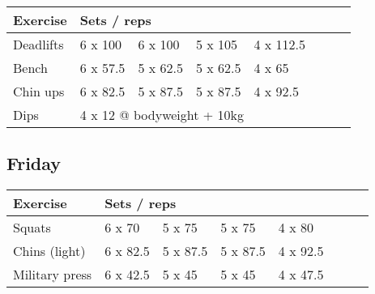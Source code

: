 \documentclass[12pt, a4paper]{article}%
\begin{document}
  \begin{tabular}{l|lllllll}
  \hspace{0.75em} \textbf{Exercise} & \multicolumn{ 7 }{l}{ \textbf{Sets / reps} } \\ \hline

            \hspace{0.75em} Deadlifts
            & 6 x 100
            & 6 x 100
            & 5 x 105
            & 4 x 112.5
            & 
            & 
            & 
            \\


            \hspace{0.75em} Bench
            & 6 x 57.5
            & 5 x 62.5
            & 5 x 62.5
            & 4 x 65
            & 
            & 
            & 
            \\


            \hspace{0.75em} Chin ups
            & 6 x 82.5
            & 5 x 87.5
            & 5 x 87.5
            & 4 x 92.5
            & 
            & 
            & 
            \\


   \hspace{0.75em} Dips &  \multicolumn{ 7 }{l}{ 4 x 12 @ bodyweight + 10kg } \\
  \end{tabular}

  \subsection*{\hspace{0.5em} Friday }


  \begin{tabular}{l|lllllll}
  \hspace{0.75em} \textbf{Exercise} & \multicolumn{ 7 }{l}{ \textbf{Sets / reps} } \\ \hline

            \hspace{0.75em} Squats
            & 6 x 70
            & 5 x 75
            & 5 x 75
            & 4 x 80
            & 
            & 
            & 
            \\


            \hspace{0.75em} Chins (light)
            & 6 x 82.5
            & 5 x 87.5
            & 5 x 87.5
            & 4 x 92.5
            & 
            & 
            & 
            \\


            \hspace{0.75em} Military press
            & 6 x 42.5
            & 5 x 45
            & 5 x 45
            & 4 x 47.5
            & 
            & 
            & 
            \\


  \end{tabular}
\end{document}
